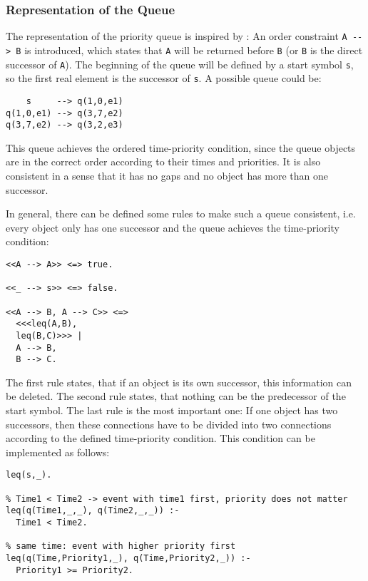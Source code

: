 \subsubsection{Representation of the Queue}

The representation of the priority queue is inspired by \cite[38\psqq]{fru_chr_book_2009}: An order constraint \lstinline|A --> B| is introduced, which states that \lstinline|A| will be returned before \lstinline|B| (or \lstinline|B| is the direct successor of \lstinline|A|). The beginning of the queue will be defined by a start symbol \lstinline|s|, so the first real element is the successor of \lstinline|s|. A possible queue could be:

\begin{lstlisting}
    s     --> q(1,0,e1)
q(1,0,e1) --> q(3,7,e2)
q(3,7,e2) --> q(3,2,e3)
\end{lstlisting}

This queue achieves the ordered time-priority condition, since the queue objects are in the correct order according to their times and priorities. It is also consistent in a sense that it has no gaps and no object has more than one successor.

In general, there can be defined some rules to make such a queue consistent, i.e. every object only has one successor and the queue achieves the time-priority condition:

\begin{lstlisting}
<<A --> A>> <=> true.

<<_ --> s>> <=> false.

<<A --> B, A --> C>> <=>
  <<<leq(A,B),
  leq(B,C)>>> |
  A --> B,
  B --> C.
\end{lstlisting}

The first rule states, that if an object is its own successor, this information can be deleted. The second rule states, that nothing can be the predecessor of the start symbol. The last rule is the most important one: If one object has two successors, then these connections have to be divided into two connections according to the defined time-priority condition. This condition can be implemented as follows:

\begin{lstlisting}
leq(s,_).

% Time1 < Time2 -> event with time1 first, priority does not matter
leq(q(Time1,_,_), q(Time2,_,_)) :- 
  Time1 < Time2.

% same time: event with higher priority first
leq(q(Time,Priority1,_), q(Time,Priority2,_)) :- 
  Priority1 >= Priority2.
\end{lstlisting}

